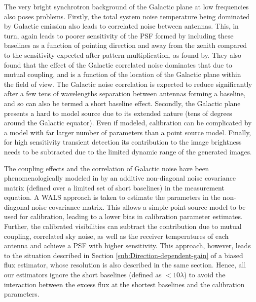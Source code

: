 \documentclass{aa}
\begin{document}
The very bright synchrotron background  of the Galactic plane at low frequencies
also poses problems. Firstly, the total system noise temperature being dominated
by Galactic emission  also leads to correlated noise  between antennas. This, in
turn, again  leads to poorer  sensitivity of the  PSF formed by  including these
baselines as a function of pointing  direction and away from the zenith compared
to   the   sensitivity  expected   after   pattern   multiplication,  as   found
by\citet{ellingson2011sensitivity}.   They also  found  that the  effect of  the
Galactic  correlated noise  dominates  that due  to  mutual coupling,  and is  a
function of  the location of  the Galactic plane  within the field of  view. The
Galactic noise correlation is expected  to reduce significantly after a few tens
of wavelengths separation  between antennas forming a baseline,  and so can also
be termed a short baseline effect.  Secondly, the Galactic plane presents a hard
to model source  due to its extended nature (tens of  degrees around the Galactic
equator).  Even if  modeled, calibration can be complicated by  a model with far
larger  number  of parameters  than  a point  source  model.  Finally, for  high
sensitivity transient  detection its contribution to the  image brightness needs
to be subtracted due to the  limited dynamic range of the generated images. 

The  coupling  effects   and  the  correlation  of  Galactic   noise  have  been
phenomenologically   modeled  in   \citet{wijnholds2010self}   by  an   additive
non-diagonal  noise covariance  matrix  (defined  over a  limited  set of  short
baselines) in the measurement equation. A WALS approach is taken to estimate the
parameters in  the non-diagonal  noise covariance matrix.  This allows  a simple
point  source model  to be  used for  calibration, leading  to a  lower  bias in
calibration  parameter  estimates.  Further,  the  calibrated  visibilities  can
subtract the contribution due to  mutual coupling, correlated sky noise, as well
as  the receiver  temperatures of  each antenna  and achieve  a PSF  with higher
sensitivity. This approach, however, leads to the situation described in Section
\ref{sub:Direction-dependent-gain} of a  biased flux estimator, whose resolution
is also  described in the  same section.  Hence,  all our estimators  ignore the
short baselines (defined  as $<10\lambda$) to avoid the  interaction between the
excess flux at the shortest baselines and the calibration parameters.

\end{document}
